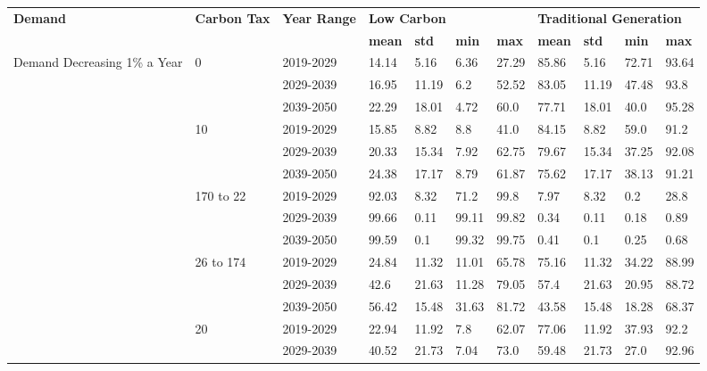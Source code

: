 \begin{table}[H]
	\begin{tabular}{|l|l|l|l|l|l|l|l|l|l|l|}
		\hline
		\multirow{2}{*}{\textbf{Demand}} & \multirow{2}{*}{\textbf{Carbon Tax}} & \multirow{2}{*}{\textbf{Year Range}} & \multicolumn{4}{l|}{\textbf{Low Carbon}} & \multicolumn{4}{l|}{\textbf{Traditional Generation}} \\ \cline{4-11} 
		&  &  & \textbf{mean} & \textbf{std} & \textbf{min} & \textbf{max} & \textbf{mean} & \textbf{std} & \textbf{min} & \textbf{max} \\ \hline
		\multirow{24}{*}{Demand Decreasing 1\% a Year} & \multirow{3}{*}{0} & 2019-2029 & 14.14 & 5.16 & 6.36 & 27.29 & 85.86 & 5.16 & 72.71 & 93.64 \\ \cline{3-11} 
		&  & 2029-2039 & 16.95 & 11.19 & 6.2 & 52.52 & 83.05 & 11.19 & 47.48 & 93.8 \\ \cline{3-11} 
		&  & 2039-2050 & 22.29 & 18.01 & 4.72 & 60.0 & 77.71 & 18.01 & 40.0 & 95.28 \\ \cline{2-11} 
		& \multirow{3}{*}{10} & 2019-2029 & 15.85 & 8.82 & 8.8 & 41.0 & 84.15 & 8.82 & 59.0 & 91.2 \\ \cline{3-11} 
		&  & 2029-2039 & 20.33 & 15.34 & 7.92 & 62.75 & 79.67 & 15.34 & 37.25 & 92.08 \\ \cline{3-11} 
		&  & 2039-2050 & 24.38 & 17.17 & 8.79 & 61.87 & 75.62 & 17.17 & 38.13 & 91.21 \\ \cline{2-11} 
		& \multirow{3}{*}{170 to 22} & 2019-2029 & 92.03 & 8.32 & 71.2 & 99.8 & 7.97 & 8.32 & 0.2 & 28.8 \\ \cline{3-11} 
		&  & 2029-2039 & 99.66 & 0.11 & 99.11 & 99.82 & 0.34 & 0.11 & 0.18 & 0.89 \\ \cline{3-11} 
		&  & 2039-2050 & 99.59 & 0.1 & 99.32 & 99.75 & 0.41 & 0.1 & 0.25 & 0.68 \\ \cline{2-11} 
		& \multirow{3}{*}{26 to 174} & 2019-2029 & 24.84 & 11.32 & 11.01 & 65.78 & 75.16 & 11.32 & 34.22 & 88.99 \\ \cline{3-11} 
		&  & 2029-2039 & 42.6 & 21.63 & 11.28 & 79.05 & 57.4 & 21.63 & 20.95 & 88.72 \\ \cline{3-11} 
		&  & 2039-2050 & 56.42 & 15.48 & 31.63 & 81.72 & 43.58 & 15.48 & 18.28 & 68.37 \\ \cline{2-11} 
		& \multirow{3}{*}{20} & 2019-2029 & 22.94 & 11.92 & 7.8 & 62.07 & 77.06 & 11.92 & 37.93 & 92.2 \\ \cline{3-11} 
		&  & 2029-2039 & 40.52 & 21.73 & 7.04 & 73.0 & 59.48 & 21.73 & 27.0 & 92.96 \\ \cline{3-11} 

\end{tabular}
\end{table}
